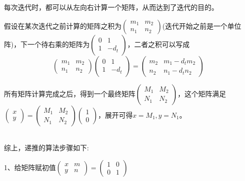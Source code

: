\documentclass[UTF8,a4paper,11pt]{ctexart}
\begin{document}
	\par 每次迭代时，都可以从左向右计算一个矩阵，从而达到了迭代的目的。
	\par 假设在某次迭代之前计算的矩阵之积为$\left(\begin{matrix}m_{1} & m_{2}\\n_{1} & n_{2}\end{matrix}\right)$(迭代开始之前是一个单位阵)，下一个待右乘的矩阵为$\left(\begin{matrix}0 & 1\\1 & -d_{t}\end{matrix}\right)$，二者之积可以写成\\
	$$
		\left(\begin{matrix}m_{1} & m_{2}\\n_{1} & n_{2}\end{matrix}\right)
		\left(\begin{matrix}0 & 1\\1 & -d_{t}\end{matrix}\right)
		=
		\left(\begin{matrix}m_{2} & m_{1}-d_{t}m_{2}\\n_{2} & n_{1}-d_{t}n_{2}\end{matrix}\right)
	$$
	\par 所有矩阵计算完成之后，得到一个最终矩阵$\left(\begin{matrix}M_{1} & M_{2}\\N_{1} & N_{2}\end{matrix}\right)$，这个矩阵满足$\left(\begin{matrix}x\\ y \end{matrix}\right) =\left(\begin{matrix}M_{1} & M_{2}\\N_{1} & N_{2}\end{matrix}\right) \left(\begin{matrix} 1 \\0\end{matrix}\right)$，展开可得$x=M_{1},y=N_{1}$。\\ \\
	
	\par 综上，递推的算法步骤如下:
	\par 1、给矩阵赋初值$\left(\begin{matrix}x & m\\y & n\end{matrix}\right) =\left(\begin{matrix}1 & 0\\0 & 1\end{matrix}\right) $ 
\end{document}
